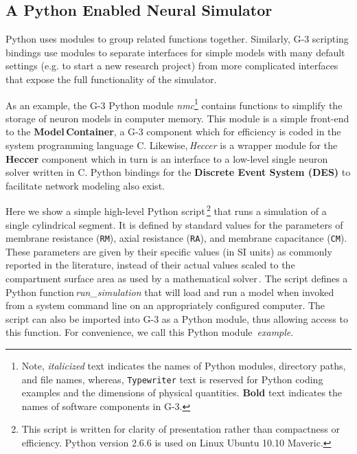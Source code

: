 \documentclass[10pt]{article}
\begin{document}
\subsection*{A Python Enabled Neural Simulator}
\label{ss-apens}

Python uses modules to group related functions together.
Similarly, G-3 scripting bindings use modules to separate interfaces for
simple models with many default settings (e.g. to start a new research
project) from more complicated interfaces that expose the full
functionality of the simulator.

As an example, the G-3 Python module {\it nmc}\footnote{Note, {\it italicized} text indicates the names of Python modules, directory paths, and file names, whereas, {\tt Typewriter} text is reserved for Python coding examples and the dimensions of physical quantities. {\bf Bold} text indicates the names of software components in G-3.} contains functions to
simplify the storage of neuron models in computer memory.  This module
is a simple front-end to the {\bf Model\,Container}, a G-3 component
which for efficiency is coded in the system programming language C.
Likewise,\,{\it Heccer} is a wrapper module for the {\bf Heccer}
component which in turn is an interface to a low-level single neuron
solver written in C.  Python bindings for the {\bf Discrete Event
  System (DES)} to facilitate network modeling also exist.

Here we show a simple high-level Python script\,\footnote{This script
  is written for clarity of presentation rather than compactness or
  efficiency.  Python version 2.6.6 is used on Linux Ubuntu 10.10
  Maveric.} that runs a simulation of a single cylindrical segment. It
is defined by standard values for the parameters of membrane
resistance ({\tt RM}), axial resistance ({\tt RA}), and membrane
capacitance ({\tt CM}).
These parameters are given by their specific values (in SI units) as
commonly reported in the literature, instead of their actual values
scaled to the compartment surface area as used by a mathematical
solver\,\cite{cornelis04:_neuros_param_handl}. The script defines a
Python function\,{\it run\_simulation} that will load and run a model when invoked from
a system command line on an appropriately configured computer.  The script
can also be imported into G-3 as a Python module, thus allowing access
to this function.  For convenience, we call this Python module\,{\it
  example}.
\end{document}
